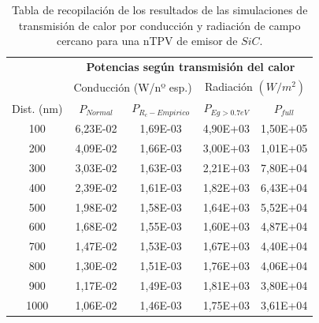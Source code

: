 \begin{table}[h]
	\centering
	\caption{Tabla de recopilación de los resultados de las simulaciones de transmisión de calor por conducción y radiación de campo cercano para una nTPV de emisor de $SiC$.}
		\begin{tabular}{|c||c|c||c|c|}
		\hline
\multirow{2}{*}{ }& \multicolumn{4}{c|}{\textbf{\large Potencias según transmisión del calor}}\\ \cline{2-5}
& \multicolumn{2}{c||}{Conducción (W/nº esp.)}& \multicolumn{2}{c|}{Radiación $(W/m^2)$}\\ \hline
Dist. (nm)&$P_{Normal}$&$P_{R_c-Empirico}$&$P_{Eg>0.7eV}$&$P_{full}$\\ \hline \hline
100&6,23E-02&1,69E-03&4,90E+03&1,50E+05\\ \hline 
200&4,09E-02&1,66E-03&3,00E+03&1,01E+05\\ \hline 
300&3,03E-02&1,63E-03&2,21E+03&7,80E+04\\ \hline 
400&2,39E-02&1,61E-03&1,82E+03&6,43E+04\\ \hline 
500&1,98E-02&1,58E-03&1,64E+03&5,52E+04\\ \hline 
600&1,68E-02&1,55E-03&1,60E+03&4,87E+04\\ \hline 
700&1,47E-02&1,53E-03&1,67E+03&4,40E+04\\ \hline 
800&1,30E-02&1,51E-03&1,76E+03&4,06E+04\\ \hline 
900&1,17E-02&1,49E-03&1,81E+03&3,80E+04\\ \hline 
1000&1,06E-02&1,46E-03&1,75E+03&3,61E+04\\ \hline 
		\end{tabular}
	\label{tab:SiCSiO2Ge}
\end{table}

\vfill \newpage
